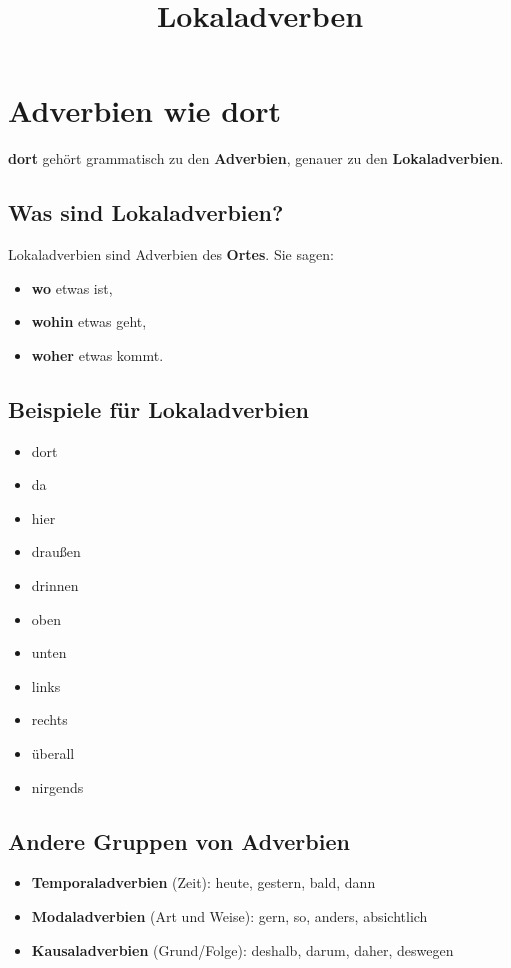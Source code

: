 \documentclass[a4paper]{article}
\title{Lokaladverben}
\date{}
\begin{document}
    \maketitle
    
    
    \section*{Adverbien wie \glqq dort\grqq}
        
        \textbf{dort} gehört grammatisch zu den \textbf{Adverbien}, genauer zu den \textbf{Lokaladverbien}.
        
        \subsection*{Was sind Lokaladverbien?}
            Lokaladverbien sind Adverbien des \textbf{Ortes}. Sie sagen:
            \begin{itemize}
                \item \textbf{wo} etwas ist,
                \item \textbf{wohin} etwas geht,
                \item \textbf{woher} etwas kommt.
            \end{itemize}
        
        \subsection*{Beispiele für Lokaladverbien}
            \begin{itemize}
                \item dort
                \item da
                \item hier
                \item draußen
                \item drinnen
                \item oben
                \item unten
                \item links
                \item rechts
                \item überall
                \item nirgends
            \end{itemize}
        
        \subsection*{Andere Gruppen von Adverbien}
            \begin{itemize}
                \item \textbf{Temporaladverbien} (Zeit): heute, gestern, bald, dann
                \item \textbf{Modaladverbien} (Art und Weise): gern, so, anders, absichtlich
                \item \textbf{Kausaladverbien} (Grund/Folge): deshalb, darum, daher, deswegen
            \end{itemize}
        
\end{document}
